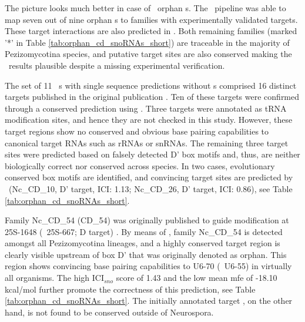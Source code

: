 The picture looks much better in case of \afu\ orphan \sno s. The
\snostrip\ pipeline was able to map seven out of nine orphan \cd s to
families with experimentally validated targets. These target interactions
are also predicted in \afu. Both remaining families (marked  '*' in
Table \ref{tab:orphan_cd_snoRNAs_short}) are traceable in the majority of
Pezizomycotina species, and putative target sites are also conserved making
the \snostrip\ results plausible despite a missing experimental
verification.

The set of 11 \ncr\ \sno s with single sequence predictions without
 \sno s comprised 16 distinct targets
published in the original publication \cite{Li:2005}.  Ten of these targets
were confirmed through a conserved prediction using \snostrip.  Three
targets were annotated as tRNA modification sites, and hence they are not
checked in this study. However, these target regions show no conserved and
obvious base pairing capabilities to canonical target RNAs such as rRNAs or
snRNAs. The remaining three target sites were predicted based on falsely
detected D' box motifs and, thus, are neither biologically correct nor
conserved across species. In two cases, evolutionary conserved box motifs
are identified, and convincing target sites are predicted by \snostrip\
(Nc\_CD\_10, D' target, ICI: 1.13; Nc\_CD\_26, D' target, ICI: 0.86), see
Table \ref{tab:orphan_cd_snoRNAs_short}.

Family Nc\_CD\_54 (CD\_54) was originally published to guide modification
at 25S-1648 (\ncr\ 25S-667; D target) \cite{Liu:2009}. By means of
\snostrip, family Nc\_CD\_54 is detected amongst all Pezizomycotina
lineages, and a highly conserved target region is clearly visible upstream
of box D' that was originally denoted as orphan. This region shows
convincing base pairing capabilities to U6-70 (\ncr\ U6-55) in virtually
all organisms. The high ICI$_{sno}$ score of 1.43 and
the low mean mfe of -18.10 kcal/mol further promote the correctness of this
prediction, see Table \ref{tab:orphan_cd_snoRNAs_short}. The initially
annotated target \PFS{for box D}, on the other hand, is not found to be
conserved outside of Neurospora.

